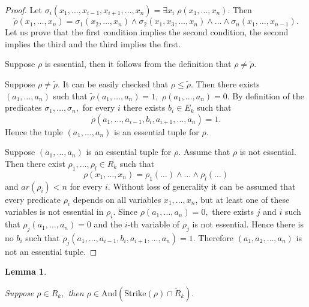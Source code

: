 \documentclass{au}
\theoremstyle{plain}
\newtheorem{lemma}{Lemma}
\theoremstyle{definition}
\theoremstyle{remark}
\numberwithin{equation}{section}
\begin{document}
\begin{proof}

Let $\sigma_{i}(x_{1},\ldots,x_{i-1},x_{i+1},\ldots,x_{n}) = \exists x_{i}\; \rho(x_{1},\ldots,x_{n}).$
Then $$\widetilde \rho (x_{1},\ldots,x_{n}) = \sigma_{1}(x_{2},\ldots,x_{n})\wedge  \sigma_{2}(x_{1},x_{3},\ldots,x_{n})\wedge
\ldots\wedge \sigma_{n}(x_{1},\ldots,x_{n-1}).$$
Let us prove that the first condition implies the second condition,
the second implies the third and the third implies the first.

Suppose $\rho$ is essential, then it follows from the definition that
$\rho \neq \widetilde\rho.$

Suppose  $\rho \neq \widetilde\rho.$ It can be easily checked that $\rho \le \widetilde \rho.$
Then there exists $(a_{1},\ldots,a_{n})$
such that $\widetilde \rho(a_{1},\ldots,a_{n})=1,$
$\rho(a_{1},\ldots,a_{n})=0.$
By definition of the predicates
$\sigma_{1},\ldots,\sigma_{n},$
for every $i$ there exists
$b_{i}\in E_{k}$
such that
$$\rho(a_{1},\ldots,a_{i-1},b_{i},a_{i+1},\ldots,a_{n}) = 1.$$
Hence the tuple $(a_{1},\ldots,a_{n})$ is an essential tuple for $\rho.$

Suppose $(a_{1},\ldots,a_{n})$ is an essential tuple for $\rho.$
Assume that $\rho$ is not essential. Then there exist $\rho_{1},\ldots, \rho_{l}\in R_{k}$
such that
$$\rho(x_{1},\ldots,x_{n}) = \rho_{1}(\ldots)\wedge \ldots\wedge \rho_{l}(\ldots)$$
and
$ar(\rho_{i})<n$
for every $i.$
Without loss of generality it can be assumed that
every predicate $\rho_{i}$ depends on all variables $x_{1},\ldots,x_{n}$,
but at least one of these variables is not essential in $\rho_{i}.$
Since $\rho(a_{1},\ldots,a_{n})=0,$
there exists $j$ and $i$ such that $\rho_{j}(a_{1},\ldots,a_{n}) =0$
and the $i$-th variable of $\rho_{j}$ is not essential.
Hence there is no $b_{i}$ such that
$\rho_{j}(a_{1},\ldots,a_{i-1},b_{i},a_{i+1},\ldots,a_{n}) =1.$
Therefore $(a_{1},a_{2},\ldots,a_{n})$ is not an essential tuple.

\end{proof}

\begin{lemma}\label{razlojenieNesushestvennogo}

Suppose $\rho\in R_{k},$   then
$\rho \in {
\mathrm{And}
}({
\mathrm{Strike}
}(\rho)\cap \widetilde R_{k}).$

\end{lemma}
\end{document}
